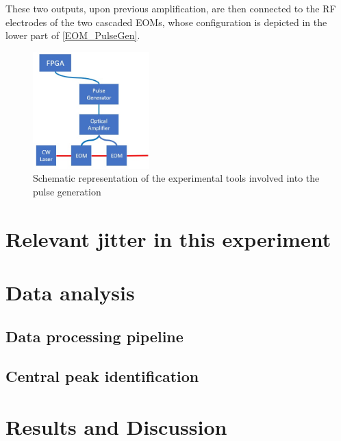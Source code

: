 These two outputs, upon previous amplification, are then connected to the RF electrodes of the two cascaded EOMs, whose configuration is depicted in the lower part of \autoref{EOM_PulseGen}.  

\begin{figure}[hbtp]
\centering
\includegraphics[width=0.4\textwidth]{EOM_Pulse_Sketch.jpg}
\caption{Schematic representation of the experimental tools involved into the pulse generation}
\label{EOM_PulseGen}
\end{figure}

\section{Relevant jitter in this experiment}
\label{sec:Jitter Sources}
\section{Data analysis}
\label{sec:DataAnalysis}
\subsection{Data processing pipeline}
\label{subsec:Pipeline}
\subsection{Central peak identification}
\label{subsec:CentralPeakId}
\section{Results and Discussion}
\label{EOMresults}